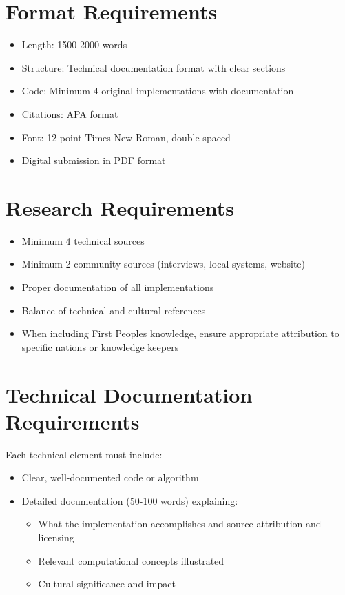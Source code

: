\documentclass[12pt]{article}
\begin{document}
\newpage


\section*{Format Requirements}
\begin{itemize}
    \item Length: 1500-2000 words
    \item Structure: Technical documentation format with clear sections
    \item Code: Minimum 4 original implementations with documentation
    \item Citations: APA format
    \item Font: 12-point Times New Roman, double-spaced
    \item Digital submission in PDF format
\end{itemize}


\section*{Research Requirements}
\begin{itemize}
    \item Minimum 4 technical sources
    \item Minimum 2 community sources (interviews, local systems, website)
    \item Proper documentation of all implementations
    \item Balance of technical and cultural references
    \item When including First Peoples knowledge, ensure appropriate attribution to specific nations or knowledge keepers
\end{itemize}
\section*{Technical Documentation Requirements}
Each technical element must include:
\begin{itemize}
    \item Clear, well-documented code or algorithm
    \item Detailed documentation (50-100 words) explaining:
    \begin{itemize}
        \item What the implementation accomplishes and source attribution and licensing
        \item Relevant computational concepts illustrated
        \item Cultural significance and impact
    \end{itemize}
    \end{itemize}
\end{document}

